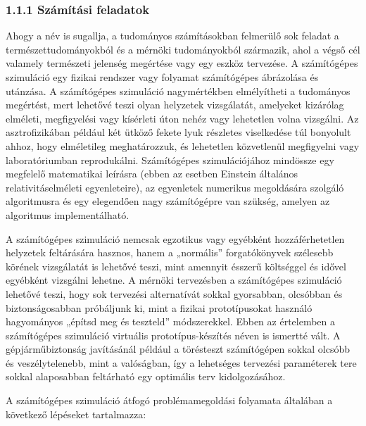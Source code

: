 \documentclass[
  magyar,
  11pt]{article}
\begin{document}
\subsubsection{1.1.1 Számítási
feladatok}\label{szuxe1muxedtuxe1si-feladatok}

Ahogy a név is sugallja, a tudományos számításokban felmerülő sok
feladat a természettudományokból és a mérnöki tudományokból származik,
ahol a végső cél valamely természeti jelenség megértése vagy egy eszköz
tervezése. A számítógépes szimuláció egy fizikai rendszer vagy folyamat
számítógépes ábrázolása és utánzása. A számítógépes szimuláció
nagymértékben elmélyítheti a tudományos megértést, mert lehetővé teszi
olyan helyzetek vizsgálatát, amelyeket kizárólag elméleti, megfigyelési
vagy kísérleti úton nehéz vagy lehetetlen volna vizsgálni. Az
asztrofizikában például két ütköző fekete lyuk részletes viselkedése túl
bonyolult ahhoz, hogy elméletileg meghatározzuk, és lehetetlen
közvetlenül megfigyelni vagy laboratóriumban reprodukálni. Számítógépes
szimulációjához mindössze egy megfelelő matematikai leírásra (ebben az
esetben Einstein általános relativitáselméleti egyenleteire), az
egyenletek numerikus megoldására szolgáló algoritmusra és egy elegendően
nagy számítógépre van szükség, amelyen az algoritmus implementálható.

A számítógépes szimuláció nemcsak egzotikus vagy egyébként
hozzáférhetetlen helyzetek feltárására hasznos, hanem a „normális''
forgatókönyvek szélesebb körének vizsgálatát is lehetővé teszi, mint
amennyit ésszerű költséggel és idővel egyébként vizsgálni lehetne. A
mérnöki tervezésben a számítógépes szimuláció lehetővé teszi, hogy sok
tervezési alternatívát sokkal gyorsabban, olcsóbban és biztonságosabban
próbáljunk ki, mint a fizikai prototípusokat használó hagyományos
„építsd meg és teszteld'' módszerekkel. Ebben az értelemben a
számítógépes szimuláció virtuális prototípus-készítés néven is ismertté
vált. A gépjárműbiztonság javításánál például a törésteszt számítógépen
sokkal olcsóbb és veszélytelenebb, mint a valóságban, így a lehetséges
tervezési paraméterek tere sokkal alaposabban feltárható egy optimális
terv kidolgozásához.

A számítógépes szimuláció átfogó problémamegoldási folyamata általában a
következő lépéseket tartalmazza:
\end{document}
